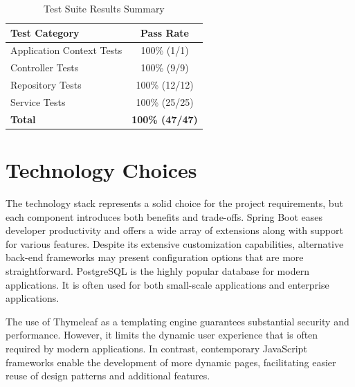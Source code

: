 \begin{table}[htbp]
    \centering
    \caption{Test Suite Results Summary}
    \begin{tabular}{|p{}|c|}
        \hline
        \textbf{Test Category}    & \textbf{Pass Rate}     \\
        \hline
        Application Context Tests & 100\% (1/1)            \\
        \hline
        Controller Tests          & 100\% (9/9)            \\
        \hline
        Repository Tests          & 100\% (12/12)          \\
        \hline
        Service Tests             & 100\% (25/25)          \\
        \hline
        \textbf{Total}            & \textbf{100\% (47/47)} \\
        \hline
    \end{tabular}
    \label{tab:test-results}
\end{table}


\section{Technology Choices}\label{sec:technology-choices}

The technology stack represents a solid choice for the project requirements, but each component introduces both benefits and trade-offs.
Spring Boot eases developer productivity and offers a wide array of extensions along with support for various features.
Despite its extensive customization capabilities, alternative back-end frameworks may present configuration options that are more straightforward.
PostgreSQL is the highly popular database for modern applications.
It is often used for both small-scale applications and enterprise applications.\cite{ThebenefitsofPostgreSQL,GerritMeyer2025}

The use of Thymeleaf as a templating engine guarantees substantial security and performance.
However, it limits the dynamic user experience that is often required by modern applications.
In contrast, contemporary JavaScript frameworks enable the development of more dynamic pages, facilitating easier reuse of design patterns and additional features.
